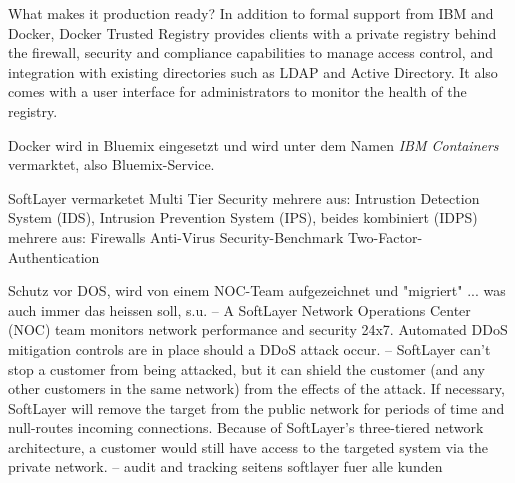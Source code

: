 \documentclass[../main.tex]{subfiles}
\begin{document}
    What makes it production ready? In addition to formal support from IBM and Docker, Docker Trusted Registry provides clients with a private registry behind the firewall, security and compliance capabilities to manage access control, and integration with existing directories such as LDAP and Active Directory. It also comes with a user interface for administrators to monitor the health of the registry.

    \cite{https://developer.ibm.com/bluemix/2015/10/23/ibm-and-docker-bring-production-ready-containers-to-europe/}



    Docker wird in Bluemix eingesetzt und wird unter dem Namen \emph{IBM Containers} vermarktet, also Bluemix-Service.


    SoftLayer vermarketet Multi Tier Security
    \cite{http://www.softlayer.com/security}
    mehrere aus: Intrustion Detection System (IDS), Intrusion Prevention System (IPS), beides kombiniert (IDPS)
    mehrere aus: Firewalls
    Anti-Virus
    Security-Benchmark
    Two-Factor-Authentication
    \cite{http://www.softlayer.com/SECURITY-SOFTWARE}

    Schutz vor DOS, wird von einem NOC-Team aufgezeichnet und "migriert" ... was auch immer das heissen soll, s.u.
    -- A SoftLayer Network Operations Center (NOC) team monitors network performance and security 24x7. Automated DDoS mitigation controls are in place should a DDoS attack occur.
    -- SoftLayer can’t stop a customer from being attacked, but it can shield the customer (and any other customers in the same network) from the effects of the attack. If necessary, SoftLayer will remove the target from the public network for periods of time and null-routes incoming connections. Because of SoftLayer’s three-tiered network architecture, a customer would still have access to the targeted system via the private network.
    -- audit and tracking seitens softlayer fuer alle kunden
    \cite{http://blog.softlayer.com/2014/softlayer-security-questions-and-answers}
\end{document}
